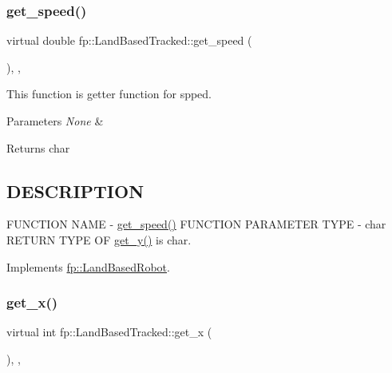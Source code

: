 \subsubsection{\texorpdfstring{get\+\_\+speed()}{get\_speed()}}
{\footnotesize\ttfamily virtual double fp\+::\+Land\+Based\+Tracked\+::get\+\_\+speed (\begin{DoxyParamCaption}{ }\end{DoxyParamCaption})\hspace{0.3cm}{\ttfamily [inline]}, {\ttfamily [override]}, {\ttfamily [virtual]}}



This function is getter function for spped. 


\begin{DoxyParams}{Parameters}
{\em None} & \\
\hline
\end{DoxyParams}
\begin{DoxyReturn}{Returns}
char 
\end{DoxyReturn}
\hypertarget{_m_a_z_e_8h_DESCRIPTION}{}\subsection{D\+E\+S\+C\+R\+I\+P\+T\+I\+ON}\label{_m_a_z_e_8h_DESCRIPTION}
F\+U\+N\+C\+T\+I\+ON N\+A\+ME -\/ \hyperlink{classfp_1_1_land_based_tracked_a5c5c280d150b040bd5f862f2f64d83f1}{get\+\_\+speed()} F\+U\+N\+C\+T\+I\+ON P\+A\+R\+A\+M\+E\+T\+ER T\+Y\+PE -\/ char R\+E\+T\+U\+RN T\+Y\+PE OF \hyperlink{classfp_1_1_land_based_tracked_a09738928390e7e0d33444b6a7cfcc841}{get\+\_\+y()} is char. 

Implements \hyperlink{classfp_1_1_land_based_robot_a68844e9c442d1b293945144dc6c6608c}{fp\+::\+Land\+Based\+Robot}.

\mbox{\label{classfp_1_1_land_based_tracked_a3a4fc3c84dd3fcf1928a27af1658680f}} 
\subsubsection{\texorpdfstring{get\+\_\+x()}{get\_x()}}
{\footnotesize\ttfamily virtual int fp\+::\+Land\+Based\+Tracked\+::get\+\_\+x (\begin{DoxyParamCaption}{ }\end{DoxyParamCaption})\hspace{0.3cm}{\ttfamily [inline]}, {\ttfamily [override]}, {\ttfamily [virtual]}}



